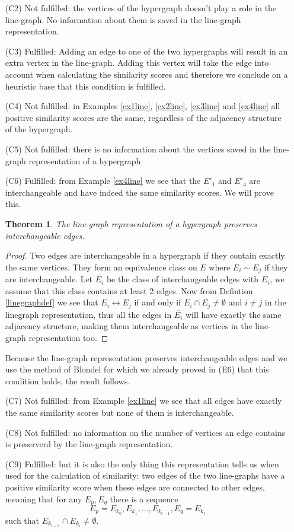 \documentclass[a4paper,11pt]{report}
\newtheorem{theorem}{Theorem}[section]
\begin{document}
\begin{itemize}
 
   \item[(C2)] Not fulfilled: the vertices of the hypergraph doesn't play a role 
   in the line-graph. No information about them is saved in the line-graph 
   representation.
  \item[(C3)] Fulfilled: Adding an edge to one of the two hypergraphs will 
  result in an extra vertex in the line-graph. Adding this vertex will take the 
  edge into account when calculating the similarity scores and therefore we 
  conclude on a heuristic base that this condition is fulfilled.
  \item[(C4)] Not fulfilled: in Examples \ref{ex1line}, \ref{ex2line}, \ref{ex3line}  
  and \ref{ex4line}
  all positive similarity scores are the same, regardless of the adjacency 
  structure of the hypergraph.
  \item[(C5)] Not fulfilled: there is no information about the vertices saved in 
  the line-graph representation of a hypergraph.
  \item[(C6)] Fulfilled: from Example \ref{ex4line} we see that the $E'_1$ and 
 $E'_4$ are interchangeable and have indeed the same similarity scores. We will 
 prove this.
 
 \begin{theorem}
   The line-graph representation of a hypergraph preserves interchangeable 
   edges.
 \end{theorem}
 \begin{proof}
   Two edges are interchangeable in a hypergraph if they contain exactly the same 
   vertices. They form an equivalence class on $E$ where $E_i \sim E_j$ if they 
   are interchangeable. Let $\overline{E_i}$ be the class of interchangeable 
   edges with $E_i$, we assume that this class contains at least 2 edges. Now from Defintion \ref{linegraphdef} we see that
   $E_i \leftrightarrow E_j$ if and only if $E_i \cap E_j \not = \emptyset$ and $i \not = j$ 
   in the linegraph representation, thus all the edges in $\overline{E_i}$ will 
   have exactly the same adjacency structure, making them interchangeable as vertices in the 
   line-graph representation too.
 \end{proof}
 Because the line-graph representation preserves interchangeable edges and we use the method of Blondel for which we already proved
 in (E6) that this condition holds, the result follows.
  \item[(C7)] Not fulfilled: from Example \ref{ex1line} we see that all edges 
  have exactly the same similarity scores but none of them is interchangeable.
   \item[(C8)] Not fulfilled: no information on the number of vertices an edge 
contains is preserverd by the line-graph representation.
  \item[(C9)] Fulfilled: but it is also the only thing this representation tells us 
  when used for the calculation of similarity: two edges of the two line-graphs
  have a positive similarity score when these edges are connected to other edges, meaning that for any $E_p, E_q$ there is a sequence 
  $$E_p = E_{k_0}, E_{k_1}, \ldots, E_{k_{l-1}}, E_q = E_{k_l}$$
  such that $E_{k_{i-1}} \cap E_{k_i} \not = \emptyset$. 
  

\end{itemize}
\end{document}
